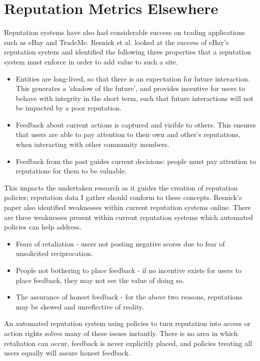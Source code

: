 \section{Reputation Metrics Elsewhere}

Reputation systems have also had considerable success on trading applications such as eBay and TradeMe. Resnick et al. \cite{resnick2000reputation,resnick2002trust} looked at the success of eBay's reputation system and identified the following three properties that a reputation system must enforce in order to add value to such a site. 

\begin{itemize}
 \item Entities are long-lived, so that there is an expectation for future interaction. This generates a 'shadow of the future', and provides incentive for users to behave with integrity in the short term, such that future interactions will not be impacted by a poor reputation. 
 \item Feedback about current actions is captured and visible to others. This ensures that users are able to pay attention to their own and other's reputations, when interacting with other community members. 
 \item Feedback from the past guides current decisions: people must pay attention to reputations for them to be valuable. 
\end{itemize}

This impacts the undertaken research as it guides the creation of reputation policies; reputation data I gather should conform to these concepts. Resnick's paper also identified weaknesses within current reputation systems online. There are three weaknesses present within current reputation systems which automated policies can help address. 

\begin{itemize}
 \item Fears of retaliation - users not posting negative scores due to fear of unsolicited reciprocation.
 \item People not bothering to place feedback - if no incentive exists for users to place feedback, they may not see the value of doing so.
 \item The assurance of honest feedback - for the above two reasons, reputations may be skewed and unreflective of reality.
\end{itemize}

An automated reputation system using policies to turn reputation into access or action rights solves many of these issues instantly. There is no area in which retaliation can occur, feedback is never explicitly placed, and policies treating all users equally will assure honest feedback.

